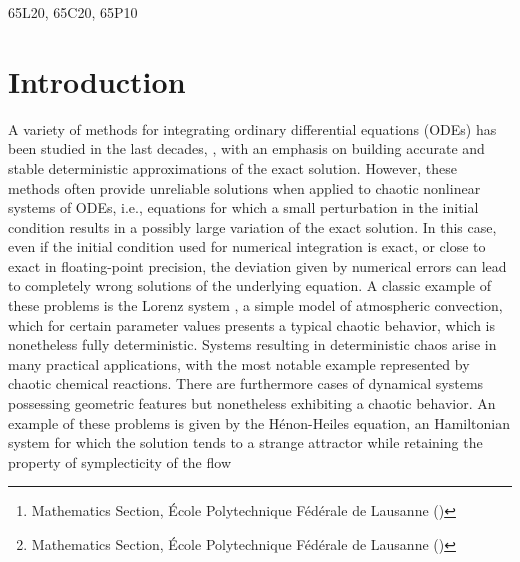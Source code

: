 \documentclass{siamart1116}
\title{{\TheTitle}}
\author{Assyr Abdulle\thanks{Mathematics Section, \'Ecole Polytechnique F\'ed\'erale de Lausanne (\email{assyr.abdulle@epfl.ch})}
		\and
		Giacomo Garegnani\thanks{Mathematics Section, \'Ecole Polytechnique F\'ed\'erale de Lausanne (\email{giacomo.garegnani@epfl.ch})}}
\numberwithin{theorem}{section}
\newcommand{\corr}[1]{{\color{bordeaux}#1}}
\begin{document}
\maketitle	

\begin{abstract} 
	We present a novel probabilistic numerical method for the integration of ODEs based on random time step selection. Theoretical analysis investigating the properties of mean square and weak convergence is fully developed. We show that the measure obtained with repeated sampling converges in mean-square sense independently of the number of samples. We present the geometric properties of conservation of polynomial first integrals and symplecticity, which constitute the main advantage with respect to an additive noise method \cite{CGS16}. A complete set of numerical experiments confirms our theoretical findings.
\end{abstract}

\begin{AMS} 65L20, 65C20, 65P10 \end{AMS}

\section{Introduction} 
A variety of methods for integrating ordinary differential equations (ODEs) has been studied in the last decades, \corr{\cite{HNW93, HaW96, HLW06}, with an emphasis on} building accurate and stable deterministic approximations of the exact solution. However, these methods often provide unreliable solutions when applied to chaotic nonlinear systems of ODEs, i.e., equations for which a small perturbation in the initial condition results in a possibly large variation of the exact solution. In this case, even if the initial condition used for numerical integration is exact, \corr{or close to exact} in floating-point precision, the deviation given by numerical errors can lead to completely wrong solutions of the underlying equation. A classic example of these problems is the Lorenz system \cite{Lor63}, a simple model of atmospheric convection, which for certain parameter values presents a typical chaotic behavior, which is nonetheless fully deterministic. Systems resulting in deterministic chaos arise in many practical applications, with the most notable example represented by chaotic chemical reactions. There are furthermore cases of dynamical systems possessing geometric features but nonetheless exhibiting a chaotic behavior. An example of these problems is given by the Hénon-Heiles equation, an Hamiltonian system for which the solution tends to a strange attractor while retaining the property of symplecticity of the flow \corr{\cite{HeH64}}
\end{document}
